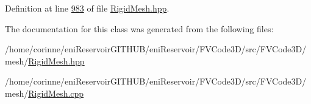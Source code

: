 Definition at line \hyperlink{RigidMesh_8hpp_source_l00983}{983} of file \hyperlink{RigidMesh_8hpp_source}{Rigid\+Mesh.\+hpp}.



The documentation for this class was generated from the following files\+:\begin{DoxyCompactItemize}
\item 
/home/corinne/eni\+Reservoir\+G\+I\+T\+H\+U\+B/eni\+Reservoir/\+F\+V\+Code3\+D/src/\+F\+V\+Code3\+D/mesh/\hyperlink{RigidMesh_8hpp}{Rigid\+Mesh.\+hpp}\item 
/home/corinne/eni\+Reservoir\+G\+I\+T\+H\+U\+B/eni\+Reservoir/\+F\+V\+Code3\+D/src/\+F\+V\+Code3\+D/mesh/\hyperlink{RigidMesh_8cpp}{Rigid\+Mesh.\+cpp}\end{DoxyCompactItemize}
